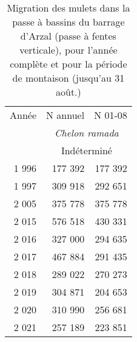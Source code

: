 \begin{table}[ht]
\centering
\begin{tabular}{rrr}
  \toprule
Année & N annuel & N 01-08 \\ 
  &\multicolumn{2}{c}{\textit{Chelon ramada}}  \\
						&\multicolumn{2}{c}{Indéterminé} \\
						 \midrule
1 996 & 177 392 & 177 392 \\ 
  1 997 & 309 918 & 292 651 \\ 
  2 005 & 375 778 & 375 778 \\ 
  2 015 & 576 518 & 430 331 \\ 
  2 016 & 327 000 & 294 635 \\ 
  2 017 & 467 884 & 291 435 \\ 
  2 018 & 289 022 & 270 273 \\ 
  2 019 & 304 871 & 204 653 \\ 
  2 020 & 310 990 & 256 681 \\ 
  2 021 & 257 189 & 223 851 \\ 
   \bottomrule
\end{tabular}
\caption{Migration des mulets dans la passe à bassins du barrage d'Arzal 
				(passe à fentes verticale), pour l'année complète et pour la période de montaison 
				(jusqu'au 31 août.)} 
\label{table_bilanannuel_mulets_0108}
\end{table}
